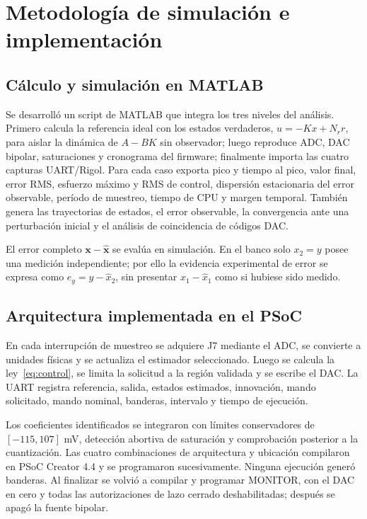 \section{Metodología de simulación e implementación}
\subsection{Cálculo y simulación en MATLAB}
Se desarrolló un script de MATLAB que integra los tres niveles del análisis.
Primero calcula la referencia ideal con los estados
verdaderos, $u=-Kx+N_r r$, para aislar la dinámica de $A-BK$ sin observador;
luego reproduce ADC, DAC bipolar, saturaciones y cronograma del
firmware; finalmente importa las cuatro capturas UART/Rigol. Para cada caso
exporta pico y tiempo al pico, valor final, error RMS, esfuerzo máximo y RMS de
control, dispersión estacionaria del error observable, período de muestreo,
tiempo de CPU y margen temporal. También genera las trayectorias de estados, el
error observable, la convergencia ante una perturbación inicial y el análisis de
coincidencia de códigos DAC.

El error completo $\mathbf x-\widehat{\mathbf x}$ se evalúa en simulación. En
el banco solo $x_2=y$ posee una medición independiente; por ello la evidencia
experimental de error se expresa como $e_y=y-\hat x_2$, sin presentar
$x_1-\hat x_1$ como si hubiese sido medido.

\subsection{Arquitectura implementada en el PSoC}
En cada interrupción de muestreo se adquiere J7 mediante el ADC, se convierte a
unidades físicas y se actualiza el estimador seleccionado. Luego se calcula la
ley~\eqref{eq:control}, se limita la solicitud a la región validada y se escribe
el DAC. La UART registra referencia, salida, estados estimados, innovación,
mando solicitado, mando nominal, banderas, intervalo y tiempo de ejecución.

Los coeficientes identificados se integraron con límites conservadores de
$[-115,107]$ mV, detección abortiva de saturación y comprobación posterior a la
cuantización. Las cuatro combinaciones de arquitectura y ubicación compilaron
en PSoC Creator 4.4 y se programaron sucesivamente. Ninguna
ejecución generó banderas. Al finalizar se volvió a compilar y programar
MONITOR, con el DAC en cero y todas las autorizaciones de lazo cerrado
deshabilitadas; después se apagó la fuente bipolar.

